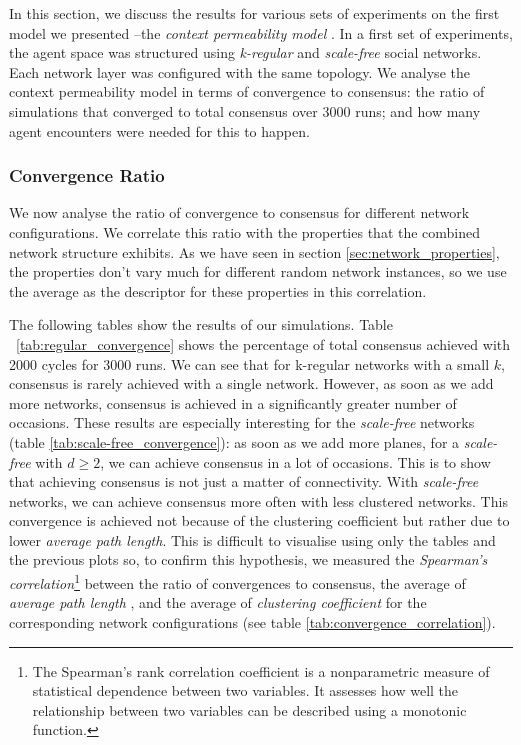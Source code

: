 \documentclass[preprint,number]{elsarticle}
\begin{document}
In this section, we discuss the results for various sets of experiments on the first model we presented --the \textit{context permeability model} \cite{Antunes2007,Antunes2010}. In a first set of experiments, the agent space was structured using \textit{k-regular} and \textit{scale-free }social networks. Each network layer was configured with the same topology. We analyse the context permeability model in terms of convergence to consensus: the ratio of simulations that converged to total consensus over 3000 runs; and how many agent encounters were needed for this to happen. 

\subsubsection{Convergence Ratio}
\label{sec:ctx_perm_convergence}
We now analyse the ratio of convergence to consensus for different network configurations. We correlate this ratio with the properties that the combined network structure exhibits. As we have seen in section \ref{sec:network_properties}, the properties don't vary much for different random network instances, so we use the average as the descriptor for these properties in this correlation.

The following tables show the results of our simulations. Table ~\ref{tab:regular_convergence} shows the percentage of total consensus achieved with 2000 cycles for 3000 runs. We can see that for k-regular networks with a small $k$, consensus is rarely achieved with a single network. However, as soon as we add more networks, consensus is achieved in a significantly greater number of occasions. These results are especially interesting for the \textit{scale-free }networks (table \ref{tab:scale-free_convergence}): as soon as we add more planes, for a \textit{scale-free} with $d\ge2$, we can achieve consensus in a lot of occasions. This is to show that achieving consensus is not just a matter of connectivity. With \textit{scale-free} networks, we can achieve consensus more often with less clustered networks. This convergence is achieved not because of the clustering coefficient but rather due to lower \textit{average path length}. This is difficult to visualise using only the tables and the previous plots so, to confirm this hypothesis, we measured the \textit{Spearman's correlation}\footnote{The Spearman's rank correlation coefficient is a nonparametric measure of statistical dependence between two variables. It assesses how well the relationship between two variables can be described using a monotonic function.} between the ratio of convergences to consensus, the average of \textit{average path length} , and the average of \textit{clustering coefficient} for the corresponding network configurations (see table \ref{tab:convergence_correlation}).
\end{document}
